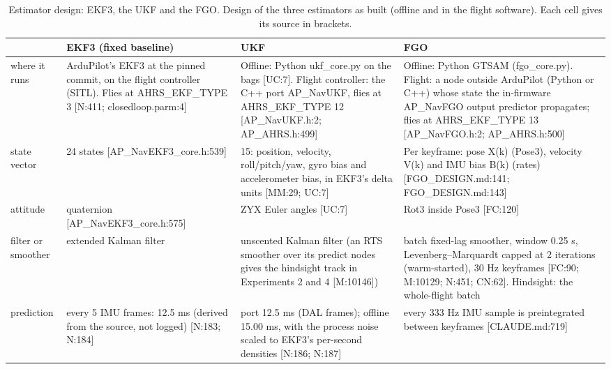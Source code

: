 \begin{table}[htbp]
\centering
\scriptsize
\caption{Estimator design: EKF3, the UKF and the FGO. Design of the three estimators as built (offline and in the flight software). Each cell gives its source in brackets.}
\label{tab:methods_estimator_design}
\begin{tabular}{p{}p{}p{}p{}}
\toprule
\textbf{} & \textbf{EKF3 (fixed baseline)} & \textbf{UKF} & \textbf{FGO} \\
\midrule
where it runs & ArduPilot's EKF3 at the pinned commit, on the flight controller (SITL). Flies at AHRS\_EKF\_TYPE 3 [N:411; closedloop.parm:4] & Offline: Python ukf\_core.py on the bags [UC:7]. Flight controller: the C++ port AP\_NavUKF, flies at AHRS\_EKF\_TYPE 12 [AP\_NavUKF.h:2; AP\_AHRS.h:499] & Offline: Python GTSAM (fgo\_core.py). Flight: a node outside ArduPilot (Python or C++) whose state the in-firmware AP\_NavFGO output predictor propagates; flies at AHRS\_EKF\_TYPE 13 [AP\_NavFGO.h:2; AP\_AHRS.h:500] \\
state vector & 24 states [AP\_NavEKF3\_core.h:539] & 15: position, velocity, roll/pitch/yaw, gyro bias and accelerometer bias, in EKF3's delta units [MM:29; UC:7] & Per keyframe: pose X(k) (Pose3), velocity V(k) and IMU bias B(k) (rates) [FGO\_DESIGN.md:141; FGO\_DESIGN.md:143] \\
attitude & quaternion [AP\_NavEKF3\_core.h:575] & ZYX Euler angles [UC:7] & Rot3 inside Pose3 [FC:120] \\
filter or smoother & extended Kalman filter & unscented Kalman filter (an RTS smoother over its predict nodes gives the hindsight track in Experiments 2 and 4 [M:10146]) & batch fixed-lag smoother, window 0.25 s, Levenberg--Marquardt capped at 2 iterations (warm-started), 30 Hz keyframes [FC:90; M:10129; N:451; CN:62]. Hindsight: the whole-flight batch \\
prediction & every 5 IMU frames: 12.5 ms (derived from the source, not logged) [N:183; N:184] & port 12.5 ms (DAL frames); offline 15.00 ms, with the process noise scaled to EKF3's per-second densities [N:186; N:187] & every 333 Hz IMU sample is preintegrated between keyframes [CLAUDE.md:719] \\

\end{tabular}
\end{table}
